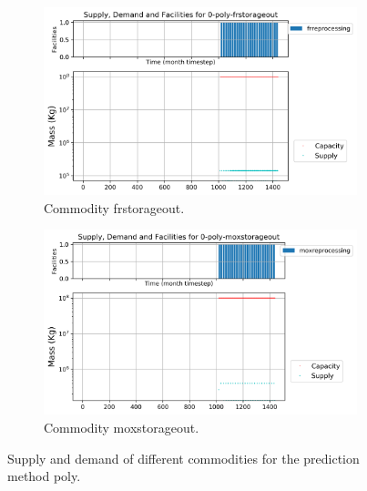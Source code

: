 \documentclass[11pt]{article}
\begin{document}
\begin{figure}[]
	\centering
	\begin{subfigure}[t]{0.45\textwidth}
		\centering
		\includegraphics[width=\linewidth]{29-figures/0-poly-frstorageout.png} 
		\caption{Commodity frstorageout.}
		\label{fig:29-frstorageout}
	\end{subfigure}
	\vspace{1cm}
	\begin{subfigure}[t]{0.45\textwidth}
		\centering
		\includegraphics[width=\linewidth]{29-figures/0-poly-moxstorageout.png} 
		\caption{Commodity moxstorageout.}
		\label{fig:29-moxstorageout}
	\end{subfigure}
	\hfill
	\caption{Supply and demand of different commodities for the prediction method poly.}
	\label{fig:29-storageout2}
\end{figure}
\end{document}
